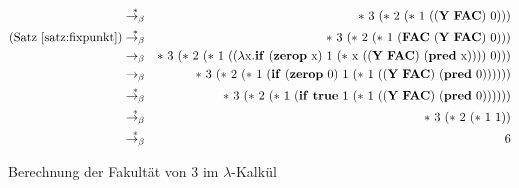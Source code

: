 \begin{figure}[!tb]
\begin{center}
\begin{eqnarray*}
    &\overset{\ast}{\rightarrow_{\beta}}&
    \ast~3~(\ast~2~(\ast~1~((\mathbf{Y}~\mathbf{FAC})~0)))\\
    \text{(Satz~\ref{satz:fixpunkt})} &\overset{\ast}{\rightarrow_{\beta}}&
    \ast~3~(\ast~2~(\ast~1~(\mathbf{FAC}~(\mathbf{Y}~\mathbf{FAC})~0)))\\
    &\rightarrow_{\beta}&
    \ast~3~(\ast~2~(\ast~1~((\lambda
    \lrm x.\mathbf{if}~(\mathbf{zerop}~\lrm x)~1~(\ast~\lrm x~((\mathbf{Y}~\mathbf{FAC})~(\mathbf{pred}~\lrm x))))~0)))\\
%
%
    &\rightarrow_{\beta}&
    \ast~3~(\ast~2~(\ast~1~(\mathbf{if}~(\mathbf{zerop}~0)~1~(\ast~1~((\mathbf{Y}~\mathbf{FAC})~(\mathbf{pred}~0))))))\\
    &\overset{\ast}{\rightarrow_{\beta}}&
    \ast~3~(\ast~2~(\ast~1~(\mathbf{if}~\mathbf{true}~1~(\ast~1~((\mathbf{Y}~\mathbf{FAC})~(\mathbf{pred}~0))))))\\
    &\overset{\ast}{\rightarrow_{\beta}}&
    \ast~3~(\ast~2~(\ast~1~1))\\
    &\overset{\ast}{\rightarrow_{\beta}}&
    6
    \end{eqnarray*}
    \caption{Berechnung der Fakultät von 3 im $\lambda$-Kalkül}
    \label{fig:fac3}
  \end{center}
\end{figure}


